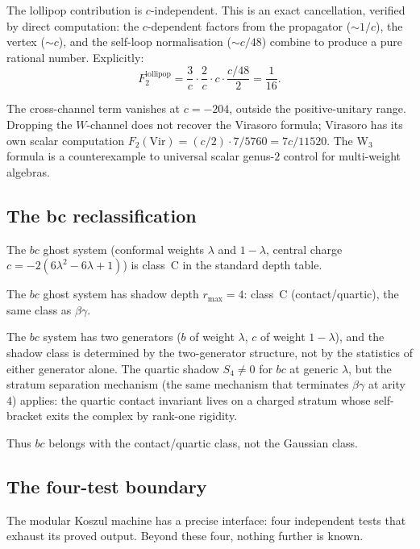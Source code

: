 \documentclass[11pt]{article}
\begin{document}
The lollipop contribution is $c$-independent.  This is an
exact cancellation, verified by direct computation: the
$c$-dependent factors from the propagator ($\sim 1/c$),
the vertex ($\sim c$), and the self-loop normalisation
($\sim c/48$) combine to produce a pure rational number.
Explicitly:
\[
F_2^{\mathrm{lollipop}}
= \frac{3}{c} \cdot \frac{2}{c} \cdot c \cdot
  \frac{c/48}{2}
= \frac{1}{16}.
\]

The cross-channel term vanishes at $c=-204$, outside the
positive-unitary range.  Dropping the $W$-channel does not recover
the Virasoro formula; Virasoro has its own scalar computation
$F_2(\mathrm{Vir})=(c/2)\cdot 7/5760=7c/11520$.  The W$_3$
formula is a counterexample to universal scalar genus-$2$
control for multi-weight algebras.


\subsection{The bc reclassification}
\label{sec:bc-reclassification}

The $bc$ ghost system (conformal weights $\lambda$ and
$1 - \lambda$, central charge $c = -2(6\lambda^2 - 6\lambda + 1)$)
is class~C in the standard depth table.

\begin{proposition}\label{prop:bc-class-c}
The $bc$ ghost system has shadow depth $r_{\max} = 4$: class~C
(contact/quartic), the same class as $\beta\gamma$.
\end{proposition}

The $bc$ system has two generators ($b$ of weight $\lambda$,
$c$ of weight $1-\lambda$), and the shadow class is determined
by the two-generator structure, not by the statistics of either
generator alone.  The quartic
shadow $S_4 \neq 0$ for $bc$ at generic $\lambda$, but the
stratum separation mechanism (the same mechanism that terminates
$\beta\gamma$ at arity~$4$) applies: the quartic contact
invariant lives on a charged stratum whose self-bracket exits the
complex by rank-one rigidity.

Thus $bc$ belongs with the contact/quartic class, not the
Gaussian class.


\subsection{The four-test boundary}
\label{sec:four-test-boundary}

The modular Koszul machine has a precise interface: four
independent tests that exhaust its proved output.  Beyond
these four, nothing further is known.
\end{document}
